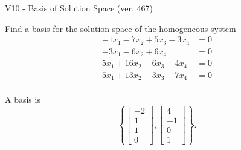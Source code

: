 \begin{exercise}
  \begin{exerciseTitle}V10 - Basis of Solution Space (ver. 467)\end{exerciseTitle}
  \begin{exerciseStatement}
    Find a basis for the solution space of the homogeneous system 
\begin{align*}
 -1 x_ 1 -7 x_ 2 + 5 x_ 3 -3 x_ 4 &= 0  \\ 
  -3 x_ 1 -6 x_ 2 + 6 x_ 4 &= 0  \\ 
  5 x_ 1 + 16 x_ 2 -6 x_ 3 -4 x_ 4 &= 0  \\ 
  5 x_ 1 + 13 x_ 2 -3 x_ 3 -7 x_ 4 &= 0  \\ 
 \end{align*}


 
  \end{exerciseStatement}

  \begin{exerciseAnswer}
   A basis is   
\[\left\{\left[\begin{array}{c}
-2 \\
1 \\
1 \\
0
\end{array}\right] , \left[\begin{array}{c}
4 \\
-1 \\
0 \\
1
\end{array}\right]\right\}.\]

  


  \end{exerciseAnswer}
\end{exercise}